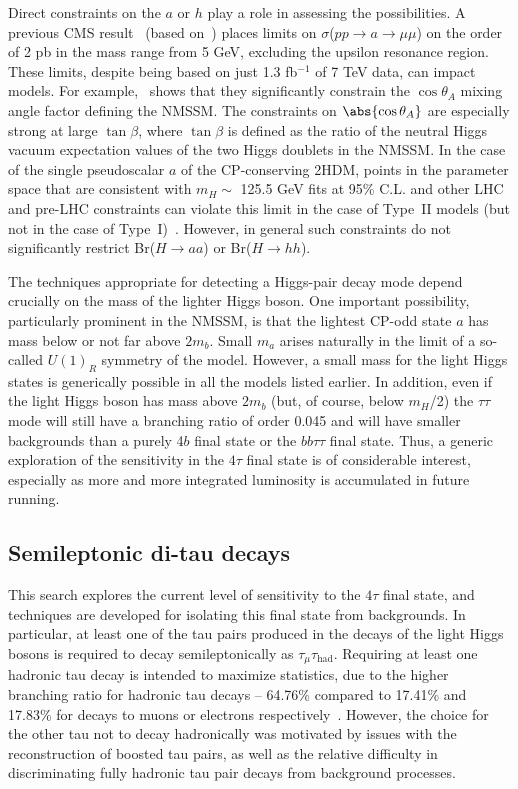 Direct constraints on the $a$ or $h$ play a role in assessing the possibilities. A previous CMS result~\cite{Chatrchyan:2012am} (based on~\cite{Dermisek:2009fd}) places limits on $\sigma$($pp$$\rightarrow$$a$$\rightarrow$$\mu\mu$) on the order of 2 pb in the mass range from 5 GeV, excluding the upsilon resonance region. These limits, despite being based on just 1.3 fb$^{-1}$ of 7 TeV data, can impact models. For example,~\cite{Chatrchyan:2012am} shows that they significantly constrain the $\cos\theta_A$ mixing angle factor defining the NMSSM.  The constraints on $\abs{\cos\theta_A}$ are especially strong at large $\tan\beta$, where $\tan\beta$ is defined as the ratio of the neutral Higgs vacuum expectation values of the two Higgs doublets in the NMSSM. In the case of the single pseudoscalar $a$ of the CP-conserving 2HDM, points in the parameter space that are consistent with $m_H \sim$ 125.5 GeV fits at 95\% C.L. and other LHC and pre-LHC constraints can violate this limit in the case of Type~II models (but not in the case of Type~I)~\cite{Dumont:2014wha}.  However, in general such constraints do not significantly restrict Br($H$$\rightarrow$$aa$) or Br($H$$\rightarrow$$hh$).  

The techniques appropriate for detecting a Higgs-pair decay mode depend crucially on the mass of the lighter Higgs boson. One important possibility, particularly prominent in the NMSSM, is that the lightest CP-odd state $a$ has mass below or not far above $2m_b$. Small $m_a$ arises naturally in the limit of a so-called $U(1)_R$ symmetry of the model. However, a small mass for the light Higgs states is generically possible in all the models listed earlier. In addition, even if the light Higgs boson has mass above $2m_b$ (but, of course, below $m_H$/2) the $\tau\tau$ mode will still have a branching ratio of order 0.045 and will have smaller backgrounds than a purely 4$b$ final state or the $bb\tau\tau$ final state. Thus, a generic exploration of the sensitivity in the $4\tau$ final state is of considerable interest, especially as more and more integrated luminosity is accumulated in future running.

\subsection{Semileptonic di-tau decays\label{sec:semileptonic}}

This search explores the current level of sensitivity to the $4\tau$ final state, and techniques are developed for isolating this final state from backgrounds. In particular, at least one of the tau pairs produced in the decays of the light Higgs bosons is required to decay semileptonically as $\tau_{\mu}\tau_{\text{had}}$. Requiring at least one hadronic tau decay is intended to maximize statistics, due to the higher branching ratio for hadronic tau decays -- 64.76\% compared to 17.41\% and 17.83\% for decays to muons or electrons respectively~\cite{Agashe:2014kda}. However, the choice for the other tau not to decay hadronically was motivated by issues with the reconstruction of boosted tau pairs, as well as the relative difficulty in discriminating fully hadronic tau pair decays from background processes.

